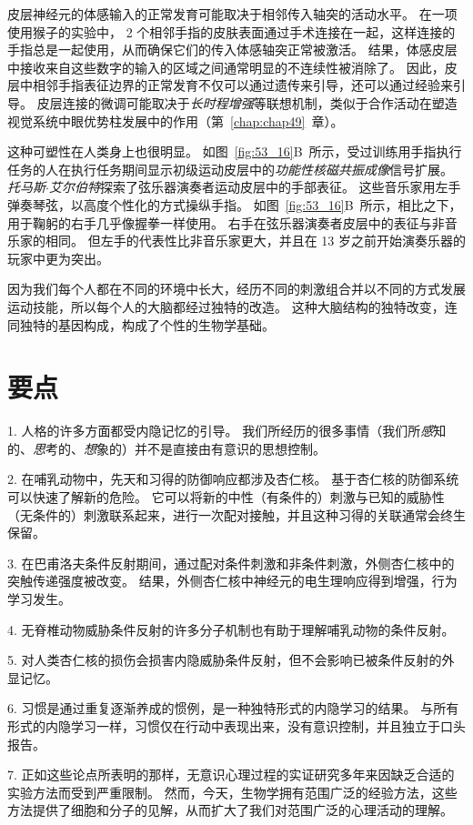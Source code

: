 皮层神经元的体感输入的正常发育可能取决于相邻传入轴突的活动水平。
在一项使用猴子的实验中， 2 个相邻手指的皮肤表面通过手术连接在一起，这样连接的手指总是一起使用，从而确保它们的传入体感轴突正常被激活。
结果，体感皮层中接收来自这些数字的输入的区域之间通常明显的不连续性被消除了。
因此，皮层中相邻手指表征边界的正常发育不仅可以通过遗传来引导，还可以通过经验来引导。
皮层连接的微调可能取决于\textit{长时程增强}等联想机制，类似于合作活动在塑造视觉系统中眼优势柱发展中的作用（第~\ref{chap:chap49}~章）。


这种可塑性在人类身上也很明显。
如图~\ref{fig:53_16}B~所示，受过训练用手指执行任务的人在执行任务期间显示初级运动皮层中的\textit{功能性核磁共振成像}信号扩展。
\textit{托马斯$\cdot$艾尔伯特}探索了弦乐器演奏者运动皮层中的手部表征。
这些音乐家用左手弹奏琴弦，以高度个性化的方式操纵手指。
如图~\ref{fig:53_16}B~所示，相比之下，用于鞠躬的右手几乎像握拳一样使用。
右手在弦乐器演奏者皮层中的表征与非音乐家的相同。
但左手的代表性比非音乐家更大，并且在 13 岁之前开始演奏乐器的玩家中更为突出。


因为我们每个人都在不同的环境中长大，经历不同的刺激组合并以不同的方式发展运动技能，所以每个人的大脑都经过独特的改造。
这种大脑结构的独特改变，连同独特的基因构成，构成了个性的生物学基础。



\section{要点}

1. 人格的许多方面都受内隐记忆的引导。
我们所经历的很多事情（我们所\textit{感}知的、\textit{思}考的、\textit{想}象的）并不是直接由有意识的思想控制。


2. 在哺乳动物中，先天和习得的防御响应都涉及杏仁核。
基于杏仁核的防御系统可以快速了解新的危险。
它可以将新的中性（有条件的）刺激与已知的威胁性（无条件的）刺激联系起来，进行一次配对接触，并且这种习得的关联通常会终生保留。


3. 在巴甫洛夫条件反射期间，通过配对条件刺激和非条件刺激，外侧杏仁核中的突触传递强度被改变。
结果，外侧杏仁核中神经元的电生理响应得到增强，行为学习发生。


4. 无脊椎动物威胁条件反射的许多分子机制也有助于理解哺乳动物的条件反射。


5. 对人类杏仁核的损伤会损害内隐威胁条件反射，但不会影响已被条件反射的外显记忆。


6. 习惯是通过重复逐渐养成的惯例，是一种独特形式的内隐学习的结果。
与所有形式的内隐学习一样，习惯仅在行动中表现出来，没有意识控制，并且独立于口头报告。


7. 正如这些论点所表明的那样，无意识心理过程的实证研究多年来因缺乏合适的实验方法而受到严重限制。
然而，今天，生物学拥有范围广泛的经验方法，这些方法提供了细胞和分子的见解，从而扩大了我们对范围广泛的心理活动的理解。


